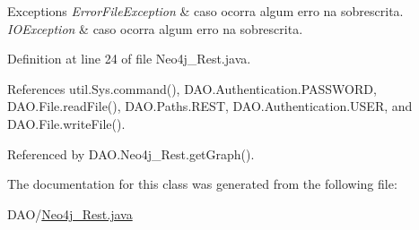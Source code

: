 \begin{DoxyExceptions}{Exceptions}
{\em Error\+File\+Exception} & caso ocorra algum erro na sobrescrita. \\
\hline
{\em I\+O\+Exception} & caso ocorra algum erro na sobrescrita. \\
\hline
\end{DoxyExceptions}


Definition at line 24 of file Neo4j\+\_\+\+Rest.\+java.



References util.\+Sys.\+command(), D\+A\+O.\+Authentication.\+P\+A\+S\+S\+W\+O\+RD, D\+A\+O.\+File.\+read\+File(), D\+A\+O.\+Paths.\+R\+E\+ST, D\+A\+O.\+Authentication.\+U\+S\+ER, and D\+A\+O.\+File.\+write\+File().



Referenced by D\+A\+O.\+Neo4j\+\_\+\+Rest.\+get\+Graph().



The documentation for this class was generated from the following file\+:\begin{DoxyCompactItemize}
\item 
D\+A\+O/\hyperlink{Neo4j__Rest_8java}{Neo4j\+\_\+\+Rest.\+java}\end{DoxyCompactItemize}
